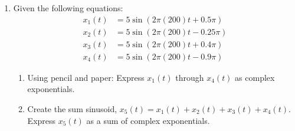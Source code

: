 \begin{enumerate}
\item Given the following equations:
\begin{align*}
x_1(t) &= 5 \sin(2\pi(200)t +0.5\pi) \\
x_2(t) &= 5 \sin(2\pi(200)t - 0.25\pi) \\
x_3(t) &= 5 \sin(2\pi(200)t +0.4\pi) \\
x_4(t) &= 5 \sin(2\pi(200)t - 0.9\pi) 
\end{align*}

\begin{enumerate}
\item Using pencil and paper: Express   $x_1(t)$ through $x_4(t)$ as complex exponentials. 
\item Create the sum sinusoid, $x_5(t)=x_1(t)+x_2(t)+x_3(t)+x_4(t)$. Express   $x_5(t)$ as a sum of complex exponentials. 	

\end{enumerate}
\end{enumerate}

